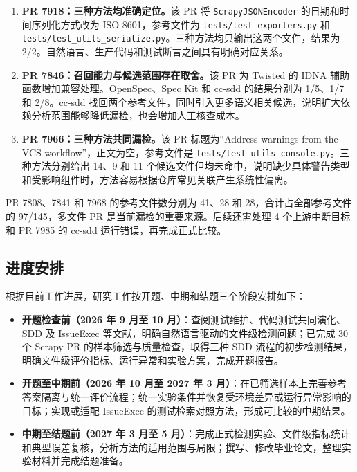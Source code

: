 \begin{enumerate}
  \item \textbf{PR 7918：三种方法均准确定位。}该 PR 将 \texttt{ScrapyJSONEncoder} 的日期和时间序列化方式改为 ISO 8601，参考文件为 \texttt{tests/test\_exporters.py} 和 \texttt{tests/test\_utils\_serialize.py}。三种方法均只输出这两个文件，结果为 2/2。自然语言、生产代码和测试断言之间具有明确对应关系。
  \item \textbf{PR 7846：召回能力与候选范围存在取舍。}该 PR 为 Twisted 的 IDNA 辅助函数增加兼容处理。OpenSpec、Spec Kit 和 cc-sdd 的结果分别为 1/5、1/7 和 2/8。cc-sdd 找回两个参考文件，同时引入更多语义相关候选，说明扩大依赖分析范围能够降低漏检，也会增加人工核查成本。
  \item \textbf{PR 7966：三种方法共同漏检。}该 PR 标题为“Address warnings from the VCS workflow”，正文为空，参考文件是 \texttt{tests/test\_utils\_console.py}。三种方法分别给出 14、9 和 11 个候选文件但均未命中，说明缺少具体警告类型和受影响组件时，方法容易根据仓库常见关联产生系统性偏离。
\end{enumerate}

PR 7808、7841 和 7968 的参考文件数分别为 41、28 和 28，合计占全部参考文件的 97/145，多文件 PR 是当前漏检的重要来源。后续还需处理 4 个上游中断目标和 PR 7985 的 cc-sdd 运行错误，再完成正式比较。

\subsection{进度安排}

根据目前工作进展，研究工作按开题、中期和结题三个阶段安排如下：

\begin{itemize}
  \item \textbf{开题检查前（2026 年 9 月至 10 月）}：查阅测试维护、代码测试共同演化、SDD 及 IssueExec 等文献，明确自然语言驱动的文件级检测问题；已完成 30 个 Scrapy PR 的样本筛选与质量检查，取得三种 SDD 流程的初步检测结果，明确文件级评价指标、运行异常和实验方案，完成开题报告。
  \item \textbf{开题至中期前（2026 年 10 月至 2027 年 3 月）}：在已筛选样本上完善参考答案隔离与统一评价流程；统一实验条件并恢复受环境差异或运行异常影响的目标；实现或适配 IssueExec 的测试检索对照方法，形成可比较的中期结果。
  \item \textbf{中期至结题前（2027 年 3 月至 5 月）}：完成正式检测实验、文件级指标统计和典型误差复核，分析方法的适用范围与局限；撰写、修改毕业论文，整理实验材料并完成结题准备。
\end{itemize}

